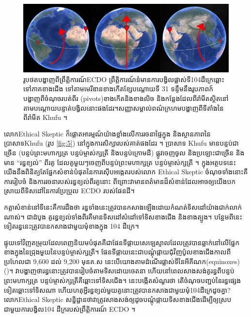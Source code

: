 \documentclass[10pt,twocolumn,letterpaper]{article}
\begin{document}
\begin{figure}[b]
\begin{center}
\includegraphics[width=1\textwidth]{drawing.jpg}
\end{center}
   \caption{រូបថតបង្ហាញពីព្រឹត្តិការណ៍ECDO ព្រឹត្តិការណ៍នំមានការបង្វិលផ្លាស់ទី104ដឺក្រេឆ្ពោះទៅភាគខាងជើង ទៅតាមមេរីឌានខាងកើតខ្សែបណ្តោយទី 31 ទន្ទឹមនឹងរូបភាពក៍បង្ហាញពីចំណុចរបត់ពីរ (pivots)ខាងកើតនិងខាងលិច និងកន្លែងដែលពីរ៉ាមីតស្ថិតនៅតាមបណ្តោយបន្ទាត់បង្វិលនោះផងដែរ។សញ្ញាសម្គាល់ពណ៌ក្រហមបង្ហាញពីទីតាំងនៃពីរ៉ាមីត Khufu ។}
\label{fig:6}
\end{figure}

លោកEthical Skeptic ក៏ផ្តោតអារម្មណ៍យ៉ាងខ្លាំងលើការរចនាផ្ទៃក្នុង និងស្ថានភាពនៃ ប្រាសាទKhufu (រូប \ref{fig:5}) នៅក្នុងការសិក្សារបស់គាត់ផងដែរ \cite{28}។ ប្រាសាទ Khufu មានបន្ទប់ជាច្រើន (បន្ទប់ព្រះមហាក្សត្រ បន្ទប់ម្ចាស់ក្សត្រី និងបន្ទប់ក្រោមដី) ផ្លូវចេញចូល និងប្រឡោះជាច្រើន និងមាន “រន្ធខ្យល់” ពីរគូ ដែលគូមួយៗចេញពីបន្ទប់ព្រះមហាក្សត្រ បន្ទប់ម្ចាស់ក្សត្រី \cite{29,30}។ ក្នុងអត្ថបទនេះ យើងនឹងពិនិត្យតែផ្នែកសំខាន់បំផុតនៃការស៊ើបអង្កេតរបស់លោក Ethical Skeptic ចំណុចទាំងនោះគឺការរៀបចំ និងការរចនារបស់រន្ធខ្យល់ពីរគូនោះ ពីព្រោះវាមានពត៌មានដ៏សំខាន់ដែលអាចឲ្យយើងបកស្រាយពីទិសដៅនៃការប្រែប្រួល ECDO របស់ផែនដី។

កត្តាសំខាន់នៅទីនេះគឺការដឹងថា រន្ធទាំងនេះត្រូវបានកសាងឡើងដោយកំណត់ទិសដៅយ៉ាងជាក់លាក់ណាស់។ ជាដំបូង គូរន្ធខ្យល់ទាំងពីរគឺមានទិសដៅសំដៅទៅទិសខាងជើង និងខាងត្បូង។ បន្ថែមពីនេះទៀតរន្ធនេះត្រូវបានកសាងជាមួយមុំខាងក្នុង 104 ដឺក្រេ។

ផ្ទុយទៅវិញតម្រុយដែលពេញនិយមបំផុតគឺជាផែនទីផ្កាយសេឡេស្ទាលដែលត្រូវបានឆ្លាក់នៅលើផ្នែកខាងក្នុងនៃជ្រុងមួយនៃបន្ទប់ម្ចាស់ក្សត្រី។ ផែនទីផ្កាយនេះជាបណ្តុំផ្កាយជុំវិញប៉ូលខាងជើងកាលពីប្រហែលជា 9,600 ដល់ 9,200 មុនគ.ស នេះបើយោងតាមដំណើរផ្លាស់ទីនៃអីគីណក(equinoxes)(\cite{28})។ វាបង្ហាញថារន្ធនោះត្រូវបានរៀបចំតាមទិសដោយចេតនា ហើយនៅពេលសាងសង់គូរន្ធពីបន្ទប់ព្រះមហាក្សត្រ បន្ទប់ម្ចាស់ក្សត្រីគឺឆ្ពោះទៅទិសជើង។ នេះបង្កើតសំណួរថា តើចំណុចបញ្ជប់នៃរន្ធផ្សេងទៀតឆ្ពោះទៅទិសណា ហើយហតុអ្វីរន្ធខ្យល់មួយគូនោះត្រូវបានកសាងជាមួយមុំ104ដឺក្រេដូចគ្នា? លោកEthical Skeptic សន្និដ្ឋានថាវាត្រូវសាងសង់ឲ្យដូចបណ្តុំផ្កាយទិសខាងជើងដើម្បីឲ្យស្របជាមួយការបង្វិល104 ដឺក្ររបស់ព្រឹត្តិការណ៍ ECDO ។
\end{document}
